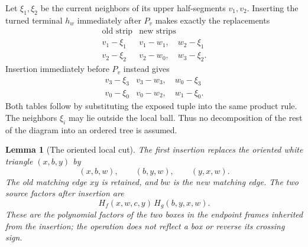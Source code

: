 \documentclass[11pt]{article}
\numberwithin{equation}{section}
\newtheorem{lemma}[theorem]{Lemma}
\theoremstyle{definition}
\begin{document}
Let \(\xi_1,\xi_2\) be the current neighbors of its upper
half-segments \(v_1,v_2\). Inserting the turned terminal \(h_w\)
immediately after \(P_v\) makes exactly the replacements
\begin{equation}\label{td:right-strips}
 \begin{array}{c|c}
 \text{old strip}&\text{new strips}\\ \hline
 v_1-\xi_1&v_1-w_1,\quad w_2-\xi_1\\
 v_2-\xi_2&v_2-w_0,\quad w_3-\xi_2 .
 \end{array}
\end{equation}
Insertion immediately before \(P_v\) instead gives
\begin{equation}\label{td:left-strips}
 \begin{array}{c|c}
 v_3-\xi_3&v_3-w_3,\quad w_0-\xi_3\\
 v_0-\xi_0&v_0-w_2,\quad w_1-\xi_0 .
 \end{array}
\end{equation}
Both tables follow by substituting the exposed tuple into the
same product rule. The neighbors \(\xi_i\) may lie outside the
local ball. Thus no decomposition of the rest of the diagram into
an ordered tree is assumed.

\begin{lemma}[The oriented local cut]\label{td:patch}
The first insertion replaces the oriented white triangle
\((x,b,y)\) by
\begin{equation}\label{td:stellar}
 (x,b,w),\qquad (b,y,w),\qquad (y,x,w).
\end{equation}
The old matching edge \(xy\) is retained, and \(bw\) is the new
matching edge. The two source factors after insertion are
\begin{equation}\label{td:local-factors}
             H_f(x,w,c,y)\,H_g(b,y,x,w).
\end{equation}
These are the polynomial factors of the two boxes in the endpoint frames inherited from the insertion; the operation does not reflect a box or reverse its crossing sign.
\end{lemma}
\end{document}
